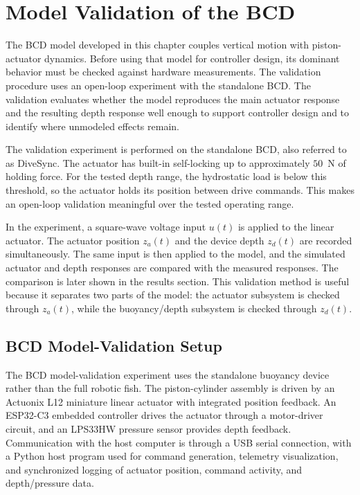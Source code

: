 \documentclass{uhcoethesis}
\begin{document}
\section{Model Validation of the BCD}

The BCD model developed in this chapter couples vertical motion with piston-actuator dynamics. Before using that model for controller design, its dominant behavior must be checked against hardware measurements. The validation procedure uses an open-loop experiment with the standalone BCD. The validation evaluates whether the model reproduces the main actuator response and the resulting depth response well enough to support controller design and to identify where unmodeled effects remain.

The validation experiment is performed on the standalone BCD, also referred to as DiveSync. The actuator has built-in self-locking up to approximately $50$~N of holding force. For the tested depth range, the hydrostatic load is below this threshold, so the actuator holds its position between drive commands. This makes an open-loop validation meaningful over the tested operating range.

In the experiment, a square-wave voltage input $u(t)$ is applied to the linear actuator. The actuator position $z_a(t)$ and the device depth $z_d(t)$ are recorded simultaneously. The same input is then applied to the model, and the simulated actuator and depth responses are compared with the measured responses. The comparison is later shown in the results section. This validation method is useful because it separates two parts of the model: the actuator subsystem is checked through $z_a(t)$, while the buoyancy/depth subsystem is checked through $z_d(t)$.

\subsection{BCD Model-Validation Setup}
\label{sec:ch3_bcd_validation_setup}

The BCD model-validation experiment uses the standalone buoyancy device rather than the full robotic fish. The piston-cylinder assembly is driven by an Actuonix L12 miniature linear actuator with integrated position feedback. An ESP32-C3 embedded controller drives the actuator through a motor-driver circuit, and an LPS33HW pressure sensor provides depth feedback. Communication with the host computer is through a USB serial connection, with a Python host program used for command generation, telemetry visualization, and synchronized logging of actuator position, command activity, and depth/pressure data.
\end{document}
